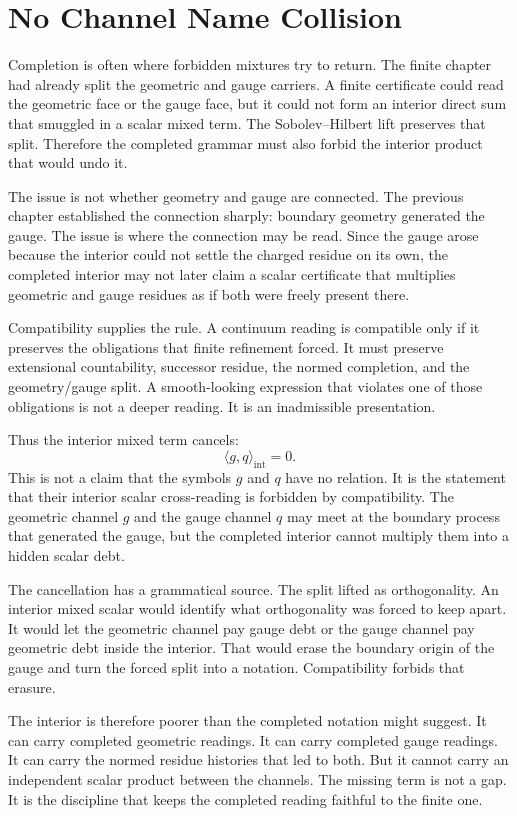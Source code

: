 \section{No Channel Name Collision}

Completion is often where forbidden mixtures try to return. The finite
chapter had already split the geometric and gauge carriers. A finite
certificate could read the geometric face or the gauge face, but it could
not form an interior direct sum that smuggled in a scalar mixed term. The
Sobolev--Hilbert lift preserves that split. Therefore the completed grammar
must also forbid the interior product that would undo it.

The issue is not whether geometry and gauge are connected. The previous
chapter established the connection sharply: boundary geometry generated the
gauge. The issue is where the connection may be read. Since the gauge arose
because the interior could not settle the charged residue on its own, the
completed interior may not later claim a scalar certificate that multiplies
geometric and gauge residues as if both were freely present there.

Compatibility supplies the rule. A continuum reading is compatible only if
it preserves the obligations that finite refinement forced. It must preserve
extensional countability, successor residue, the normed completion, and the
geometry/gauge split. A smooth-looking expression that violates one of those
obligations is not a deeper reading. It is an inadmissible presentation.

Thus the interior mixed term cancels:
\[
  \langle g,q\rangle_{\mathrm{int}} = 0 .
\]
This is not a claim that the symbols \(g\) and \(q\) have no relation. It is
the statement that their interior scalar cross-reading is forbidden by
compatibility. The geometric channel \(g\) and the gauge channel \(q\) may
meet at the boundary process that generated the gauge, but the completed
interior cannot multiply them into a hidden scalar debt.

The cancellation has a grammatical source. The split lifted as
orthogonality. An interior mixed scalar would identify what orthogonality was
forced to keep apart. It would let the geometric channel pay gauge debt or
the gauge channel pay geometric debt inside the interior. That would erase
the boundary origin of the gauge and turn the forced split into a notation.
Compatibility forbids that erasure.

The interior is therefore poorer than the completed notation might suggest.
It can carry completed geometric readings. It can carry completed gauge
readings. It can carry the normed residue histories that led to both. But it
cannot carry an independent scalar product between the channels. The missing
term is not a gap. It is the discipline that keeps the completed reading
faithful to the finite one.

